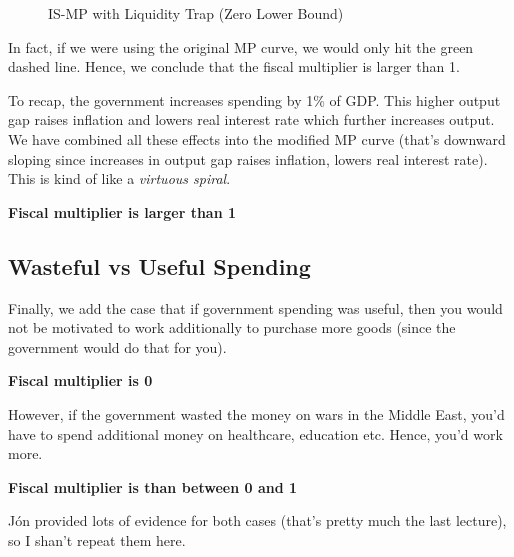 \documentclass[11pt]{scrartcl}
\newcommand{\jon}{J\'{o}n }
\newcommand{\og}{\ensuremath{\tilde{Y}}}
\begin{document}
\begin{figure}[H]
\centering
{}
\caption{IS-MP with Liquidity Trap (Zero Lower Bound)}
\end{figure}

In fact, if we were using the original MP curve, we would only hit the green dashed line. Hence, we conclude that the fiscal multiplier is larger than 1.

To recap, the government increases spending by 1\% of GDP. This higher output gap raises inflation and lowers real interest rate which further increases output. We have combined all these effects into the modified MP curve (that's downward sloping since increases in output gap raises inflation, lowers real interest rate). This is kind of like a \emph{virtuous spiral}.

\textbf{Fiscal multiplier is larger than 1}

\subsection{Wasteful vs Useful Spending}

Finally, we add the case that if government spending was useful, then you would not be motivated to work additionally to purchase more goods (since the government would do that for you).

\textbf{Fiscal multiplier is 0}

However, if the government wasted the money on wars in the Middle East, you'd have to spend additional money on healthcare, education etc. Hence, you'd work more.

\textbf{Fiscal multiplier is than between 0 and 1}

\jon provided lots of evidence for both cases (that's pretty much the last lecture), so I shan't repeat them here.
\end{document}
